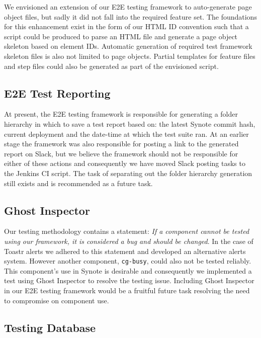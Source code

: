 We envisioned an extension of our E2E testing framework to auto-generate page object files, but sadly it did not fall into the required feature set. The foundations for this enhancement exist in the form of our HTML ID convention such that a script could be produced to parse an HTML file and generate a page object skeleton based on element IDs. Automatic generation of required test framework skeleton files is also not limited to page objects. Partial templates for feature files and step files could also be generated as part of the envisioned script.

\subsection{E2E Test Reporting}
\label{subsec:e2e-test-reporting}

At present, the E2E testing framework is responsible for generating a folder hierarchy  in which to save a test report based on: the latest Synote commit hash, current deployment and the date-time at which the test suite ran. At an earlier stage the framework was also responsible for posting a link to the generated report on Slack, but we believe the framework should not be responsible for either of these actions and consequently we have moved Slack posting tasks to the Jenkins CI script. The task of separating out the folder hierarchy generation still exists and is recommended as a future task.

\subsection{Ghost Inspector}
\label{subsec:ghost-inspector}

Our testing methodology contains a statement: \textit{If a component cannot be tested using our framework, it is considered a bug and should be changed}. In the case of Toastr alerts we adhered to this statement and developed an alternative alerts system. However another component, \texttt{cg-busy}, could also not be tested reliably. This component's use in Synote is desirable and consequently we implemented a test using Ghost Inspector to resolve the testing issue. Including Ghost Inspector in our E2E testing framework would be a fruitful future task resolving the need to compromise on component use.

\subsection{Testing Database}
\label{subsec:testing-database}

